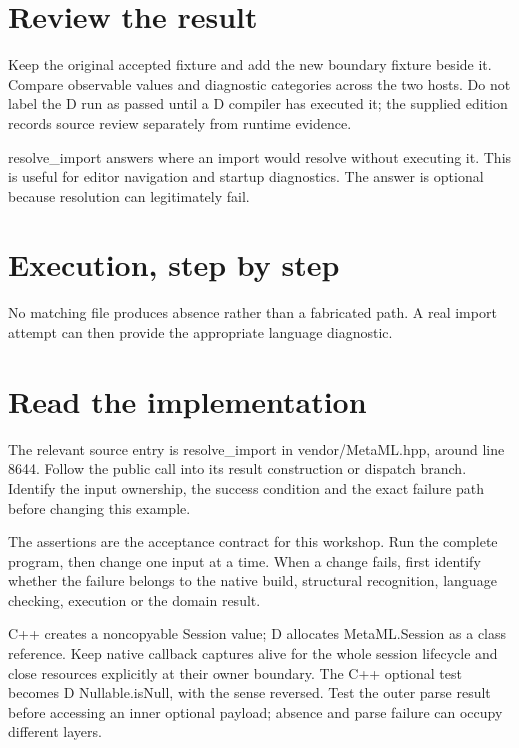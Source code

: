 \section*{Review the result}
Keep the original accepted fixture and add the new boundary fixture beside it. Compare observable values and diagnostic categories across the two hosts. Do not label the D run as passed until a D compiler has executed it; the supplied edition records source review separately from runtime evidence.

\clearpage
{}
resolve\_import answers where an import would resolve without executing it. This is useful for editor navigation and startup diagnostics. The answer is optional because resolution can legitimately fail.


\section*{Execution, step by step}
No matching file produces absence rather than a fabricated path. A real import attempt can then provide the appropriate language diagnostic.

\section*{Read the implementation}
The relevant source entry is resolve\_import in vendor/MetaML.hpp, around line 8644. Follow the public call into its result construction or dispatch branch. Identify the input ownership, the success condition and the exact failure path before changing this example.

The assertions are the acceptance contract for this workshop. Run the complete program, then change one input at a time. When a change fails, first identify whether the failure belongs to the native build, structural recognition, language checking, execution or the domain result.

\clearpage
{}
C++ creates a noncopyable Session value; D allocates MetaML.Session as a class reference. Keep native callback captures alive for the whole session lifecycle and close resources explicitly at their owner boundary. The C++ optional test becomes D Nullable.isNull, with the sense reversed. Test the outer parse result before accessing an inner optional payload; absence and parse failure can occupy different layers.

